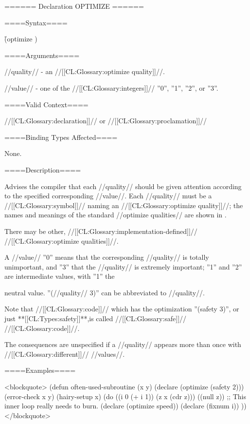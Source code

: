 ====== Declaration OPTIMIZE ======

====Syntax====

\f{(optimize )}     

====Arguments====

//quality// - an //[[CL:Glossary:optimize quality]]//.

//value// - one of the //[[CL:Glossary:integers]]// ''0'', ''1'', ''2'', or ''3''.

====Valid Context====

//[[CL:Glossary:declaration]]// or //[[CL:Glossary:proclamation]]//

====Binding Types Affected====

None.

====Description====

Advises the compiler that each //quality// should be given attention according to the specified corresponding //value//. Each //quality// must be a //[[CL:Glossary:symbol]]// naming an //[[CL:Glossary:optimize quality]]//; the names and meanings of the standard //optimize qualities// are shown in \thenextfigure.


There may be other, //[[CL:Glossary:implementation-defined]]// //[[CL:Glossary:optimize qualities]]//.

A //value// ''0'' means that the corresponding //quality// is totally unimportant, and ''3'' that the //quality// is extremely important; ''1'' and ''2'' are intermediate values, with ''1'' the

neutral value. ''(//quality// 3)'' can be abbreviated to //quality//.

Note that //[[CL:Glossary:code]]// which has the optimization ''(safety 3)'', or just **[[CL:Types:safety]]**,is called //[[CL:Glossary:safe]]// //[[CL:Glossary:code]]//.

The consequences are unspecified if a //quality// appears more than once with //[[CL:Glossary:different]]// //values//.

====Examples====

<blockquote> (defun often-used-subroutine (x y) (declare (optimize (safety 2))) (error-check x y) (hairy-setup x) (do ((i 0 (+ i 1)) (z x (cdr z))) ((null z)) ;; This inner loop really needs to burn. (declare (optimize speed)) (declare (fixnum i)) )) </blockquote>

